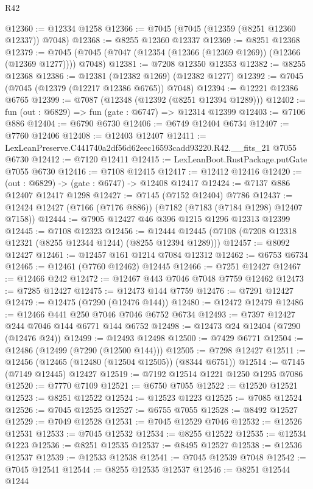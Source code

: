 \begin{lexlean}{R42}
\begin{coremodule}
{@12360 := @12334 @1258
@12366 := @7045 (@7045 (@12359 (@8251 @12360 @12337)) @7048)
@12368 := @8255 @12360 @12337
@12369 := @8251 @12368
@12379 := @7045 (@7045 (@7047 (@12354 (@12366 (@12369 @1269)) (@12366 (@12369 @1277)))) @7048)
@12381 := @7208 @12350 @12353
@12382 := @8255 @12368
@12386 := @12381 (@12382 @1269) (@12382 @1277)
@12392 := @7045 (@7045 (@12379 (@12217 @12386 @6765)) @7048)
@12394 := @12221 @12386 @6765
@12399 := @7087 (@12348 (@12392 (@8251 @12394 @1289)))
@12402 := fun (out : @6829) => fun (gate : @6747) => @12314 @12399
@12403 := @7106 @886
@12404 := @6790 @6730
@12406 := @6749 @12404 @6734
@12407 := @7760 @12406
@12408 := @12403 @12407
@12411 := LexLeanPreserve.C441740a2df56d62eec16593cadd93220.R42.__fits_21 @7055 @6730
@12412 := @7120 @12411
@12415 := LexLeanBoot.RustPackage.putGate @7055 @6730
@12416 := @7108 @12415
@12417 := @12412 @12416
@12420 := (out : @6829) -> (gate : @6747) -> @12408 @12417
@12424 := @7137 @886 @12407 @12417 @1298
@12427 := @7145 (@7152 @12404) @7786
@12437 := @12424 @12427 (@7166 (@7176 @886)) (@7182 (@7183 (@7184 @1298) @12407 @7158))
@12444 := @7905 @12427 @46 @396 @1215 @1296 @12313 @12399
@12445 := @7108 @12323
@12456 := @12444 @12445 (@7108 (@7208 @12318 @12321 (@8255 @12344 @1244) (@8255 @12394 @1289)))
@12457 := @8092 @12427
@12461 := @12457 @161 @1214 @7084 @12312
@12462 := @6753 @6734
@12465 := @12461 (@7760 @12462) @12445
@12466 := @7251 @12427
@12467 := @12466 @242
@12472 := @12467 @443 @7046 @7048 @7759 @12462
@12473 := @7285 @12427
@12475 := @12473 @144 @7759
@12476 := @7291 @12427
@12479 := @12475 (@7290 (@12476 @144))
@12480 := @12472 @12479
@12486 := @12466 @441 @250 @7046 @7046 @6752 @6734
@12493 := @7397 @12427 @244 @7046 @144 @6771 @144 @6752
@12498 := @12473 @24 @12404 (@7290 (@12476 @24))
@12499 := @12493 @12498
@12500 := @7429 @6771
@12504 := @12486 (@12499 (@7290 (@12500 @144)))
@12505 := @7298 @12427
@12511 := @12456 (@12465 (@12480 (@12504 @12505)) (@8344 @6751))
@12514 := @7145 (@7149 @12445) @12427
@12519 := @7192 @12514 @1221 @1250 @1295 @7086
@12520 := @7770 @7109
@12521 := @6750 @7055
@12522 := @12520 @12521
@12523 := @8251 @12522
@12524 := @12523 @1223
@12525 := @7085 @12524
@12526 := @7045 @12525
@12527 := @6755 @7055
@12528 := @8492 @12527
@12529 := @7049 @12528
@12531 := @7045 @12529 @7046
@12532 := @12526 @12531
@12533 := @7045 @12532
@12534 := @8255 @12522
@12535 := @12534 @1223
@12536 := @8251 @12535
@12537 := @8495 @12527
@12538 := @12536 @12537
@12539 := @12533 @12538
@12541 := @7045 @12539 @7048
@12542 := @7045 @12541
@12544 := @8255 @12535 @12537
@12546 := @8251 @12544 @1244
}
\end{coremodule}
\end{lexlean}
